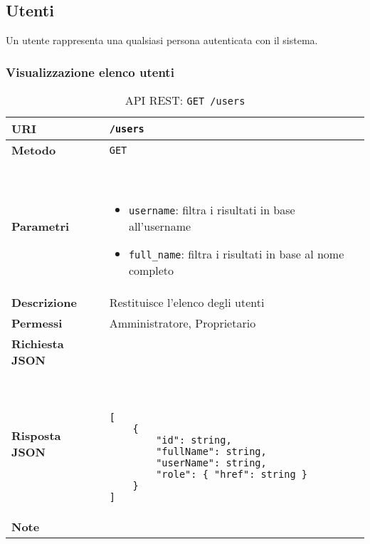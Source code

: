 \subsection{Utenti}

    Un utente rappresenta una qualsiasi persona autenticata con il sistema.

    \subsubsection{Visualizzazione elenco utenti}

        \begin{table}[H]
            \begin{center}
                \begin{tabular}{p{} p{}}
                    \toprule
                    \textbf{URI} & \texttt{/users} \\ \midrule
                    \textbf{Metodo} & \texttt{GET} \\ \midrule
                    \textbf{Parametri} & \
                        \begin{itemize}
                            \item \texttt{username}: filtra i risultati in base all'username
                            \item \texttt{full\_name}: filtra i risultati in base al nome completo
                        \end{itemize} 
                        \\ \midrule
                    \textbf{Descrizione} & Restituisce l'elenco degli utenti \\ \midrule
                    \textbf{Permessi} & Amministratore, Proprietario  \\ \midrule
                    \textbf{Richiesta JSON} & \\ \midrule
                    \textbf{Risposta JSON} & \
                        \begin{lstlisting}[basicstyle={\ttfamily}]
[
    {
        "id": string,
        "fullName": string,
        "userName": string,
        "role": { "href": string }
    }
]
                        \end{lstlisting}
                        \\ \midrule
                    \textbf{Note} & \\
                    \bottomrule
                \end{tabular}
                \caption{API REST: \texttt{GET /users}}
            \end{center}
        \end{table}

